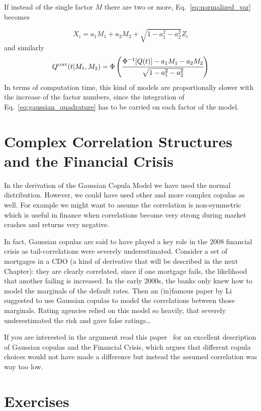 If instead of the single factor $M$ there are two or more, Eq.~\ref{eq:normalized_var} becomes

\begin{equation}
X_i = a_1 M_1 + a_2 M_2 + \sqrt{1 - a_1^2 - a^2_2}Z_i
\end{equation}
and similarly
\begin{equation}
Q^{\textrm{corr}}(t|M_1, M_2) = \Phi\left(\cfrac{\Phi^{-1}[Q(t)]-a_1 M_1 - a_2 M_2}{\sqrt{1 - a_1^2 - a^2_2}}\right)
\end{equation}
In terms of computation time, this kind of models are proportionally slower with the increase of the factor numbers, since the integration of Eq.~\ref{eq:gaussian_quadrature} has to be carried on each factor of the model.

\section{Complex Correlation Structures and the Financial Crisis}
\label{complex-correlation-structures-and-the-financial-crisis}

In the derivation of the Gaussian Copula Model we have used the normal distribution. However, we could have used other and more complex copulas as well. For example we might want to assume the correlation is non-symmetric which is useful in finance when correlations become very strong during market crashes and returns very negative.

In fact, Gaussian copulas are said to have played a key role in the 2008 financial crisis as tail-correlations were severely underestimated. Consider a set of mortgages in a CDO (a kind of derivative that will be described in the next Chapter): they are clearly correlated, since if one mortgage fails, the likelihood that another failing is increased. In the early 2000s, the banks only knew how to model the marginals of the default rates. Then an (in)famous paper by Li~\cite{bib:copula_li} suggested to use Gaussian copulas to model the correlations between those marginals. Rating agencies relied on this model so heavily, that severely underestimated the risk and gave false ratings\ldots

If you are interested in the argument read this paper~\cite{bib:copula_and_2008} for an excellent description of Gaussian copulas and the Financial Crisis, which argues that different copula choices would not have made a difference but instead the assumed correlation was way too low.

\section*{Exercises}


